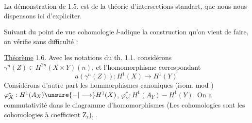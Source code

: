 La démonstration de 1.5. est de la théorie d'intersections standart, que nous nous dispensons ici d'expliciter.

Suivant du point de vue cohomologie $l$-adique la construction qu'on vient de faire, on vérifie sans difficulté :

\uline{Théorème} 1.6. Avec les notations du th. 1.1. considérons $\gamma^n(Z)\in H^{2n}(X\times Y)(n)$, et l'homomorphisme correspondant
\[
a(\gamma^n(Z)):H^1(X)\longrightarrow H^1(Y)
\]
 Considérons d'autre part  les hommorphismes canoniques (isom. mod ) $\varphi_X^*:H^1(A_X)\unsure{-|\longrightarrow} H^1(X)$, $\varphi_Y^*:H^1(A_Y)-H^1(Y)$. On a commutativité dans le diagramme d'homomorphismes
(Les cohomologies sont les cohomologies à coefficient $\mathrm{Z}_{\ell}$). .
